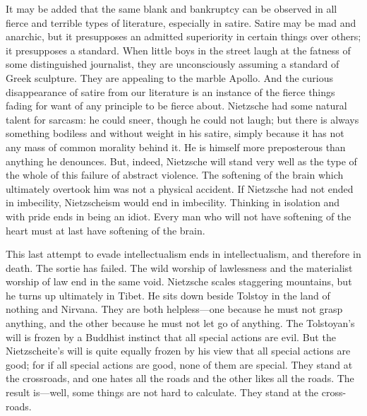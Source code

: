 It may be added that the same blank and bankruptcy can be observed in all fierce and terrible types of literature, especially in satire. Satire may be mad and anarchic, but it presupposes an admitted superiority in certain things over others; it presupposes a standard. When little boys in the street laugh at the fatness of some distinguished journalist, they are unconsciously assuming a standard of Greek sculpture. They are appealing to the marble Apollo. And the curious disappearance of satire from our literature is an instance of the fierce things fading for want of any principle to be fierce about. Nietzsche had some natural talent for sarcasm: he could sneer, though he could not laugh; but there is always something bodiless and without weight in his satire, simply because it has not any mass of common morality behind it. He is himself more preposterous than anything he denounces. But, indeed, Nietzsche will stand very well as the type of the whole of this failure of abstract violence. The softening of the brain which ultimately overtook him was not a physical accident. If Nietzsche had not ended in imbecility, Nietzscheism would end in imbecility. Thinking in isolation and with pride ends in being an idiot. Every man who will not have softening of the heart must at last have softening of the brain.

This last attempt to evade intellectualism ends in intellectualism, and therefore in death. The sortie has failed. The wild worship of lawlessness and the materialist worship of law end in the same void. Nietzsche scales staggering mountains, but he turns up ultimately in Tibet. He sits down beside Tolstoy in the land of nothing and Nirvana. They are both helpless—one because he must not grasp anything, and the other because he must not let go of anything. The Tolstoyan’s will is frozen by a Buddhist instinct that all special actions are evil. But the Nietzscheite’s will is quite equally frozen by his view that all special actions are good; for if all special actions are good, none of them are special. They stand at the crossroads, and one hates all the roads and the other likes all the roads. The result is—well, some things are not hard to calculate. They stand at the cross-roads.

